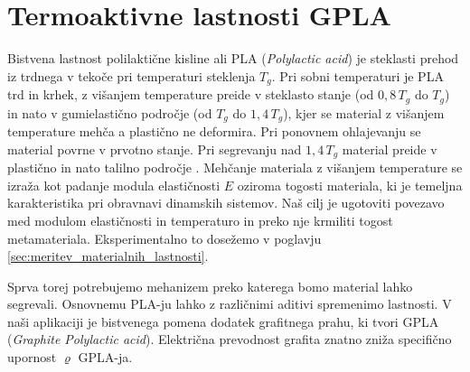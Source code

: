 \chapter{Termoaktivne lastnosti GPLA}\label{sec:PLA}
    
        Bistvena lastnost polilaktične kisline ali PLA (\textit{Polylactic acid}) je steklasti prehod iz trdnega v tekoče pri temperaturi steklenja $T_g$. Pri sobni temperaturi je PLA trd in krhek, z višanjem temperature preide v steklasto stanje (od $0,8 \, T_g$ do $T_g$) in nato v gumielastično področje (od $T_g$ do $1,4 \, T_g$), kjer se material z višanjem temperature mehča a plastično ne deformira. Pri ponovnem ohlajevanju se material povrne v prvotno stanje. Pri segrevanju nad $1,4 \, T_g$ material preide v plastično in nato talilno področje \cite{Glass_transition_Wiki}. Mehčanje materiala z višanjem temperature se izraža kot padanje modula elastičnosti $E$ oziroma togosti materiala, ki je temeljna karakteristika pri obravnavi dinamskih sistemov. Naš cilj je ugotoviti povezavo med modulom elastičnosti in temperaturo in preko nje krmiliti togost metamateriala. Eksperimentalno to dosežemo v poglavju \ref{sec:meritev_materialnih_lastnosti}. 
    
        Sprva torej potrebujemo mehanizem preko katerega bomo material lahko segrevali. Osnovnemu PLA-ju lahko z različnimi aditivi spremenimo lastnosti. V naši aplikaciji je bistvenega pomena dodatek grafitnega prahu, ki tvori GPLA (\textit{Graphite Polylactic acid}). Električna prevodnost grafita znatno zniža specifično upornost $\varrho$ GPLA-ja.
    
